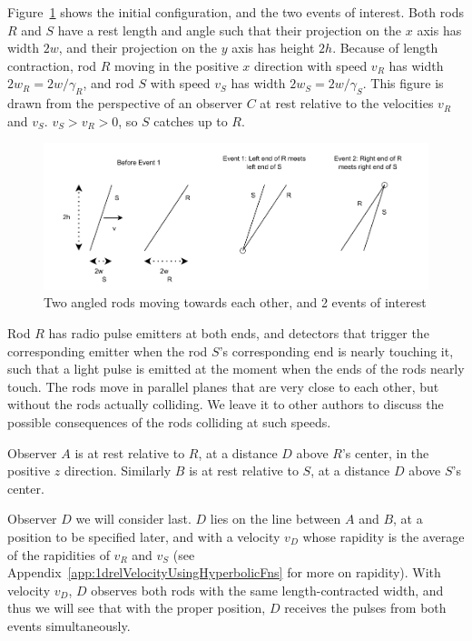 \documentclass[a4paper]{article}
\theoremstyle{plain}
\theoremstyle{definition}
\begin{document}
Figure~\ref{fig:scenario-3b} shows the initial
configuration, and the two events of interest.  Both rods $R$ and $S$
have a rest length and angle such that their projection on the $x$
axis has width $2w$, and their projection on the $y$ axis has height
$2h$.  Because of length contraction, rod $R$ moving in the positive
$x$ direction with speed $v_R$ has width $2w_R = 2w/\gamma_R$, and rod
$S$ with speed $v_S$ has width $2w_S = 2w/\gamma_S$.  This figure is
drawn from the perspective of an observer $C$ at rest relative to the
velocities $v_R$ and $v_S$.  $v_S > v_R > 0$, so $S$ catches up to
$R$.
\begin{figure}[h!]
	\centering
	\includegraphics[width=1.0\textwidth]{scenario3b-events-cropped.pdf}
	\caption{Two angled rods moving towards each other, and 2 events of interest}
	\label{fig:scenario-3b}
\end{figure}

Rod $R$ has radio pulse emitters at both ends, and detectors that
trigger the corresponding emitter when the rod $S$'s corresponding end
is nearly touching it, such that a light pulse is emitted at the
moment when the ends of the rods nearly touch.  The rods move in
parallel planes that are very close to each other, but without the
rods actually colliding.  We leave it to other authors to discuss the
possible consequences of the rods colliding at such speeds.

Observer $A$ is at rest relative to $R$, at a distance $D$ above $R$'s
center, in the positive $z$ direction.  Similarly $B$ is at rest
relative to $S$, at a distance $D$ above $S$'s center.

Observer $D$ we will consider last.  $D$ lies on the line between $A$
and $B$, at a position to be specified later, and with a velocity
$v_D$ whose rapidity is the average of the rapidities of $v_R$ and
$v_S$ (see Appendix~\ref{app:1drelVelocityUsingHyperbolicFns} for more
on rapidity).  With velocity $v_D$, $D$ observes both rods with the
same length-contracted width, and thus we will see that with the
proper position, $D$ receives the pulses from both events
simultaneously.
\end{document}
